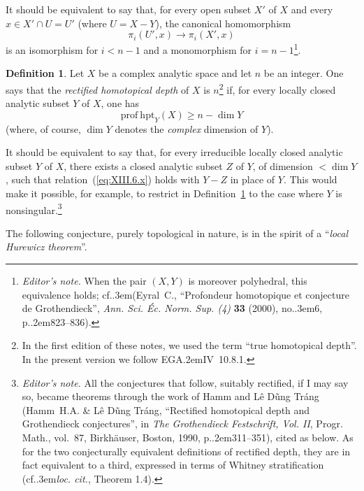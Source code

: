 \documentclass[11pt,a4paper,oneside]{book}
\providecommand{\pageoriginale}{%
  \refstepcounter{pageoriginal}%
  \marginpar{\raggedright\footnotesize\bfseries\thepageoriginal}%
  \xspace}
\providecommand{\nde}[1]{\footnote{\textit{Editor's note.} #1}}
\providecommand{\sfootnote}[1]{\footnote{#1}}
\providecommand{\og}{``}
\providecommand{\fg}{''\xspace}
\providecommand{\cf}{cf.\kern.3em}
\providecommand{\loccit}{\textit{loc. cit.}\xspace}
\providecommand{\EGA}{\textup{EGA}\kern.2em}
\providecommand{\ptbl}{.\kern.2em}
\providecommand{\numero}{no.\kern.3em}
\theoremstyle{plain}
\theoremstyle{definition}
\newtheorem{supdefinition}[subsection]{Definition}
\theoremstyle{remark}
\renewcommand{\Ref}[1]{\textup{\ref{#1}}}
\begin{document}
It should\pageoriginale be equivalent to say that, for every open subset $X'$ of $X$ and every $x\in X'\cap U=U'$ (where $U=X-Y$), the canonical homomorphism
$$
\pi_i(U',x)\to\pi_i(X',x)
$$
is an isomorphism for $i<n-1$ and a monomorphism for $i=n-1$\nde{When the pair $(X,Y)$ is moreover polyhedral, this equivalence holds; \cf (Eyral~C., {\og Profondeur homotopique et conjecture de Grothendieck\fg}, \emph{Ann. Sci. \'Ec. Norm. Sup. (4)} \textbf{33} (2000), \numero 6, p\ptbl 823--836).}.

\begin{supdefinition} \label{XIII.6.2}
Let $X$ be a complex analytic space and let $n$ be an integer. One says that the \emph{rectified homotopical depth} of $X$ is $n$\sfootnote{In the first edition of these notes, we used the term \og true homotopical depth\fg. In the present version we follow \EGA IV~10.8.1.} if, for every locally closed analytic subset $Y$ of $X$, one has
\begin{equation*} \label{eq:XIII.6.x} \tag{$x$} {\mathrm{prof\:hpt}_Y(X)\geq n-\dim Y}
\end{equation*}
(where, of course, $\dim Y$ denotes the \emph{complex} dimension of $Y$).
\end{supdefinition}

It should be equivalent to say that, for every irreducible locally closed analytic subset $Y$ of $X$, there exists a closed analytic subset $Z$ of $Y$, of dimension $<\dim Y$, such that relation~(\Ref{eq:XIII.6.x}) holds with $Y-Z$ in place of $Y$. This would make it possible, for example, to restrict in Definition~\Ref{XIII.6.2} to the case where $Y$ is nonsingular.\nde{\label{HL}All the conjectures that follow, suitably rectified, if I may say so, became theorems through the work of Hamm and L\^e D\~ung Tr\'ang (Hamm~H.A. \& L\^e D\~ung Tr\'ang, {\og Rectified homotopical depth and Grothendieck conjectures\fg}, in \emph{The Grothendieck Festschrift, Vol. II}, Progr. Math., vol.~87, Birkh\"auser, Boston, 1990, p\ptbl 311--351), cited as \cite{HL} below. As for the two conjecturally equivalent definitions of rectified depth, they are in fact equivalent to a third, expressed in terms of Whitney stratification (\cf \loccit, Theorem 1.4).}

\enlargethispage{\baselineskip}%
The following conjecture, purely topological in nature, is in the spirit of a \og \emph{local Hurewicz theorem}\fg.
\end{document}
